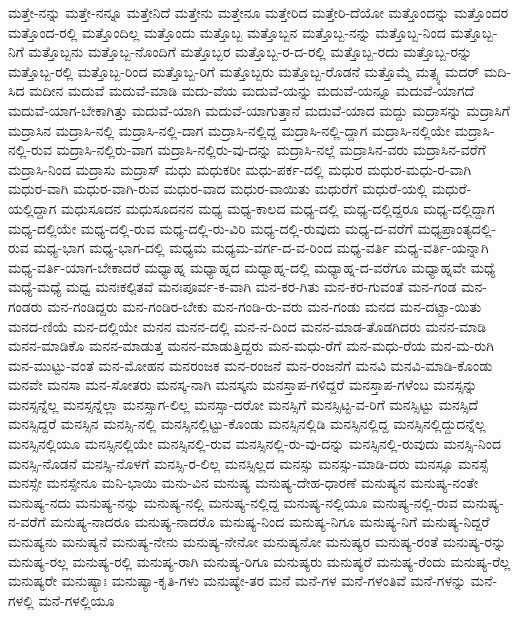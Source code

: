 {ಮತ್ತೇ-ನನ್ನು
ಮತ್ತೇ-ನನ್ನೂ
ಮತ್ತೇನಿದೆ
ಮತ್ತೇನು
ಮತ್ತೇನೂ
ಮತ್ತೇರಿದ
ಮತ್ತೇರಿ-ದೆಯೋ
ಮತ್ತೊಂದನ್ನು
ಮತ್ತೊಂದರ
ಮತ್ತೊಂದ-ರಲ್ಲಿ
ಮತ್ತೊಂದಿಲ್ಲ
ಮತ್ತೊಂದು
ಮತ್ತೊಬ್ಬ
ಮತ್ತೊಬ್ಬನ
ಮತ್ತೊಬ್ಬ-ನನ್ನು
ಮತ್ತೊಬ್ಬ-ನಿಂದ
ಮತ್ತೊಬ್ಬ-ನಿಗೆ
ಮತ್ತೊಬ್ಬನು
ಮತ್ತೊಬ್ಬ-ನೊಂದಿಗೆ
ಮತ್ತೊಬ್ಬರ
ಮತ್ತೊಬ್ಬ-ರ-ದ-ರಲ್ಲಿ
ಮತ್ತೊಬ್ಬ-ರದು
ಮತ್ತೊಬ್ಬ-ರನ್ನು
ಮತ್ತೊಬ್ಬ-ರಲ್ಲಿ
ಮತ್ತೊಬ್ಬ-ರಿಂದ
ಮತ್ತೊಬ್ಬ-ರಿಗೆ
ಮತ್ತೊಬ್ಬರು
ಮತ್ತೊಬ್ಬ-ರೊಡನೆ
ಮತ್ತೊಮ್ಮೆ
ಮತ್ಸ್ಯ
ಮದರ್
ಮದಿ-ಸಿದ
ಮದೀನ
ಮದುವೆ
ಮದುವೆ-ಮಾಡಿ
ಮದು-ವೆಯ
ಮದುವೆ-ಯನ್ನು
ಮದುವೆ-ಯನ್ನೂ
ಮದುವೆ-ಯಾಗದೆ
ಮದುವೆ-ಯಾಗ-ಬೇಕಾಗಿತ್ತು
ಮದುವೆ-ಯಾಗಿ
ಮದುವೆ-ಯಾಗುತ್ತಾನೆ
ಮದುವೆ-ಯಾದ
ಮದ್ದು
ಮದ್ರಾಸನ್ನು
ಮದ್ರಾಸಿಗೆ
ಮದ್ರಾಸಿನ
ಮದ್ರಾಸಿ-ನಲ್ಲಿ
ಮದ್ರಾಸಿ-ನಲ್ಲಿ-ದಾಗ
ಮದ್ರಾಸಿ-ನಲ್ಲಿದ್ದ
ಮದ್ರಾಸಿ-ನಲ್ಲಿ-ದ್ದಾಗ
ಮದ್ರಾಸಿ-ನಲ್ಲಿಯೇ
ಮದ್ರಾಸಿ-ನಲ್ಲಿ-ರುವ
ಮದ್ರಾಸಿ-ನಲ್ಲಿರು-ವಾಗ
ಮದ್ರಾಸಿ-ನಲ್ಲಿರು-ವು-ದನ್ನು
ಮದ್ರಾಸಿ-ನಲ್ಲೆ
ಮದ್ರಾಸಿನ-ವರು
ಮದ್ರಾಸಿನ-ವರೆಗೆ
ಮದ್ರಾಸಿ-ನಿಂದ
ಮದ್ರಾಸು
ಮದ್ರಾಸ್
ಮಧು
ಮಧುಕರೀ
ಮಧು-ಪರ್ಕ-ದಲ್ಲಿ
ಮಧುರ
ಮಧುರ-ಮಧು-ರ-ವಾಗಿ
ಮಧುರ-ವಾಗಿ
ಮಧುರ-ವಾಗಿ-ರುವ
ಮಧುರ-ವಾದ
ಮಧುರ-ವಾಯಿತು
ಮಧುರೆಗೆ
ಮಧುರೆ-ಯಲ್ಲಿ
ಮಧುರೆ-ಯಲ್ಲಿದ್ದಾಗ
ಮಧುಸೂದನ
ಮಧುಸೂದನನ
ಮಧ್ಯ
ಮಧ್ಯ-ಕಾಲದ
ಮಧ್ಯ-ದಲ್ಲಿ
ಮಧ್ಯ-ದಲ್ಲಿದ್ದರೂ
ಮಧ್ಯ-ದಲ್ಲಿದ್ದಾಗ
ಮಧ್ಯ-ದಲ್ಲಿಯೇ
ಮಧ್ಯ-ದಲ್ಲಿ-ರುವ
ಮಧ್ಯ-ದಲ್ಲಿ-ರು-ವಿರಿ
ಮಧ್ಯ-ದಲ್ಲಿ-ರುವುದು
ಮಧ್ಯ-ದ-ವರೆಗೆ
ಮಧ್ಯಪ್ರಾಂತ್ಯದಲ್ಲಿ-ರುವ
ಮಧ್ಯ-ಭಾಗ
ಮಧ್ಯ-ಭಾಗ-ದಲ್ಲಿ
ಮಧ್ಯಮ
ಮಧ್ಯಮ-ವರ್ಗ-ದ-ವ-ರಿಂದ
ಮಧ್ಯ-ವರ್ತಿ
ಮಧ್ಯ-ವರ್ತಿ-ಯನ್ನಾಗಿ
ಮಧ್ಯ-ವರ್ತಿ-ಯಾಗ-ಬೇಕಾದರೆ
ಮಧ್ಯಾಹ್ನ
ಮಧ್ಯಾಹ್ನದ
ಮಧ್ಯಾಹ್ನ-ದಲ್ಲಿ
ಮಧ್ಯಾಹ್ನ-ದ-ವರೆಗೂ
ಮಧ್ಯಾಹ್ನವೇ
ಮಧ್ಯೆ
ಮಧ್ಯೆ-ಮಧ್ಯೆ
ಮಧ್ವ
ಮನಃಕಲ್ಪಿತವೆ
ಮನಃಪೂರ್ವ-ಕ-ವಾಗಿ
ಮನ-ಕರ-ಗಿತು
ಮನ-ಕರ-ಗುವಂತೆ
ಮನ-ಗಂಡ
ಮನ-ಗಂಡರು
ಮನ-ಗಂಡಿದ್ದರು
ಮನ-ಗಂಡಿರ-ಬೇಕು
ಮನ-ಗಂಡಿ-ರು-ವರು
ಮನ-ಗಂಡು
ಮನದ
ಮನ-ದಟ್ಟಾ-ಯಿತು
ಮನದ-ಣಿಯೆ
ಮನ-ದಲ್ಲಿಯೇ
ಮನನ
ಮನನ-ದಲ್ಲಿ
ಮನ-ನ-ದಿಂದ
ಮನನ-ಮಾಡ-ತೊಡಗಿದರು
ಮನನ-ಮಾಡಿ
ಮನನ-ಮಾಡಿಕೊ
ಮನನ-ಮಾಡುತ್ತ
ಮನನ-ಮಾಡುತ್ತಿದ್ದರು
ಮನ-ಮಧು-ರೆಗೆ
ಮನ-ಮಧು-ರೆಯ
ಮನ-ಮ-ರುಗಿ
ಮನ-ಮುಟ್ಟು-ವಂತೆ
ಮನ-ಮೋಹನ
ಮನರಂಜಕ
ಮನ-ರಂಜನೆ
ಮನ-ರಂಜನೆಗೆ
ಮನವಿ
ಮನವಿ-ಮಾಡಿ-ಕೊಂಡು
ಮನವೇ
ಮನಸಾ
ಮನ-ಸೋತರು
ಮನಸ್ಕ-ನಾಗಿ
ಮನಸ್ಕನು
ಮನಸ್ತಾಪ-ಗಳಿದ್ದರೆ
ಮನಸ್ತಾಪ-ಗಳೆಂಬ
ಮನಸ್ಸನ್ನು
ಮನಸ್ಸನ್ನೆಲ್ಲ
ಮನಸ್ಸನ್ನೆಲ್ಲಾ
ಮನಸ್ಸಾಗ-ಲಿಲ್ಲ
ಮನಸ್ಸಾ-ದರೋ
ಮನಸ್ಸಿಗೆ
ಮನಸ್ಸಿಟ್ಟ-ವ-ರಿಗೆ
ಮನಸ್ಸಿಟ್ಟು
ಮನಸ್ಸಿದೆ
ಮನಸ್ಸಿದ್ದರೆ
ಮನಸ್ಸಿನ
ಮನಸ್ಸಿ-ನಲ್ಲಿ
ಮನಸ್ಸಿನಲ್ಲಿಟ್ಟು-ಕೊಂಡು
ಮನಸ್ಸಿನಲ್ಲಿಡಿ
ಮನಸ್ಸಿನಲ್ಲಿದ್ದ
ಮನಸ್ಸಿನಲ್ಲಿದ್ದುದನ್ನೆಲ್ಲ
ಮನಸ್ಸಿನಲ್ಲಿಯೂ
ಮನಸ್ಸಿನಲ್ಲಿಯೇ
ಮನಸ್ಸಿನಲ್ಲಿ-ರುವ
ಮನಸ್ಸಿನಲ್ಲಿ-ರು-ವು-ದನ್ನು
ಮನಸ್ಸಿನಲ್ಲಿ-ರುವುದು
ಮನಸ್ಸಿ-ನಿಂದ
ಮನಸ್ಸಿ-ನೊಡನೆ
ಮನಸ್ಸಿ-ನೊಳಗೆ
ಮನಸ್ಸಿ-ರ-ಲಿಲ್ಲ
ಮನಸ್ಸಿಲ್ಲದ
ಮನಸ್ಸು
ಮನಸ್ಸು-ಮಾಡಿ-ದರು
ಮನಸ್ಸೂ
ಮನಸ್ಸೆ
ಮನಸ್ಸೇ
ಮನಸ್ಸೇನೂ
ಮನಿ-ಭಾಯಿ
ಮನು-ವಿನ
ಮನುಷ್ಯ
ಮನುಷ್ಯ-ದೇಹ-ಧಾರಣೆ
ಮನುಷ್ಯನ
ಮನುಷ್ಯ-ನಂತೇ
ಮನುಷ್ಯ-ನದು
ಮನುಷ್ಯ-ನನ್ನು
ಮನುಷ್ಯ-ನಲ್ಲಿ
ಮನುಷ್ಯ-ನಲ್ಲಿದ್ದ
ಮನುಷ್ಯ-ನಲ್ಲಿಯೂ
ಮನುಷ್ಯ-ನಲ್ಲಿ-ರುವ
ಮನುಷ್ಯ-ನ-ವರೆಗೆ
ಮನುಷ್ಯ-ನಾದರೂ
ಮನುಷ್ಯ-ನಾದರೊ
ಮನುಷ್ಯ-ನಿಂದ
ಮನುಷ್ಯ-ನಿಗೂ
ಮನುಷ್ಯ-ನಿಗೆ
ಮನುಷ್ಯ-ನಿದ್ದರೆ
ಮನುಷ್ಯನು
ಮನುಷ್ಯನೆ
ಮನುಷ್ಯ-ನೇನು
ಮನುಷ್ಯ-ನೇನೋ
ಮನುಷ್ಯನೋ
ಮನುಷ್ಯರ
ಮನುಷ್ಯ-ರಂತೆ
ಮನುಷ್ಯ-ರನ್ನು
ಮನುಷ್ಯ-ರಲ್ಲ
ಮನುಷ್ಯ-ರಲ್ಲಿ
ಮನುಷ್ಯ-ರಾಗಿ
ಮನುಷ್ಯ-ರಿಗೂ
ಮನುಷ್ಯರು
ಮನುಷ್ಯರೆ
ಮನುಷ್ಯ-ರೆಂದು
ಮನುಷ್ಯ-ರೆಲ್ಲ
ಮನುಷ್ಯರೇ
ಮನುಷ್ಯಾಃ
ಮನುಷ್ಯಾ-ಕೃತಿ-ಗಳು
ಮನುಷ್ಯೇ-ತರ
ಮನೆ
ಮನೆ-ಗಳ
ಮನೆ-ಗಳಂತಿವೆ
ಮನೆ-ಗಳನ್ನು
ಮನೆ-ಗಳಲ್ಲಿ
ಮನೆ-ಗಳಲ್ಲಿಯೂ
}
